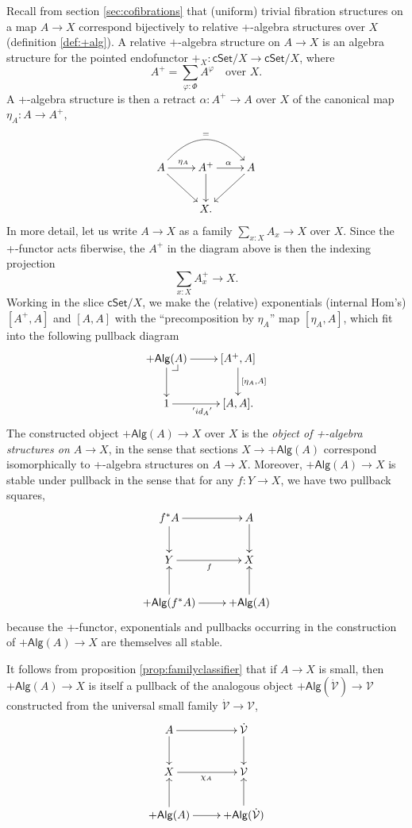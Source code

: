 \documentclass[12pt]{article}
\makeatletter
\newcommand{\cSet}{\ensuremath{\mathsf{cSet}}}
\newcommand{\pbcorner}[1][dr]{\save*!/#1-1.2pc/#1:(-1,1)@^{|-}\restore}
\newcommand{\ra}{\ensuremath{\rightarrow}}
\newcommand{\V}{\ensuremath{\mathcal{V}}}
\newcommand{\VV}{\ensuremath{\dot{\mathcal{V}}}}
\theoremstyle{remark}
\theoremstyle{definition}
\makeatother
\begin{document}
Recall from section \ref{sec:cofibrations} that (uniform) trivial fibration structures on a map $A\ra X$ correspond bijectively to relative +-algebra structures over $X$ (definition \ref{def:+alg}).  A relative $+$-algebra structure on $A \ra X$ is an algebra structure for the pointed endofunctor $+_X : \cSet/X \ra \cSet/X$, where
\[
A^+ = \sum_{\varphi:\Phi}A^{\varphi}\quad\text{over $X$}.
\]
A +-algebra structure is then a retract $\alpha : A^+\ra A$ over $X$ of the canonical map $\eta_A : A\ra A^+$,
\[
\xymatrix{
A\ar[rd] \ar[r]^{\eta_A} \ar@/^6ex/ [rr]^= & A^+ \ar[r]^{\alpha} \ar[d]& \ar[ld]A \\
& X. &
}
\]
In more detail, let us write $A\ra X$ as a family $\sum_{x:X}A_x \ra X$ over $X$. Since the +-functor acts fiberwise, the $A^+$ in the diagram above is then the indexing projection
\[
\sum_{x:X}A^+_x \ra X.
\]
Working in the slice  $\cSet/X$, we make the (relative) exponentials (internal Hom's) $[A^+, A]$ and $[A, A]$ with the ``precomposition by $\eta_A$'' map $[\eta_A, A]$, which fit into the following pullback diagram 
\[
\xymatrix{
+\mathsf{Alg}(A)\ar[d] \ar[r] \pbcorner & [A^+, A] \ar[d]^{[\eta_A, A]}\\
1 \ar[r]_{'{id_A}'} & [A, A].
}
\]
The constructed object $+\mathsf{Alg}(A) \ra X$ over $X$ is the \emph{object of +-algebra structures on $A\ra X$}, in the sense that sections $X \ra +\mathsf{Alg}(A)$ correspond isomorphically to +-algebra structures on $A\ra X$. Moreover, $+\mathsf{Alg}(A) \ra X$ is stable under pullback in the sense that for any $f:Y\ra X$, we have two pullback squares,
\begin{equation}\label{diagram:pbplus}
\xymatrix{
f^*A \ar[d] \ar[r]  & A \ar[d]\\
Y \ar[r]_{f} &X\\
+\mathsf{Alg}(f^*A)\ar[u] \ar[r] & +\mathsf{Alg}(A)\ar[u].
}
\end{equation}
because the +-functor, exponentials and pullbacks occurring in the construction of $+\mathsf{Alg}(A) \ra X$ are themselves all stable.  

It follows from proposition \ref{prop:familyclassifier} that if $A\ra X$ is small, then $+\mathsf{Alg}(A) \ra X$ is itself a pullback of the analogous object $+\mathsf{Alg}(\VV) \ra \V$ constructed from the universal small family $\VV\ra\V$,
\begin{equation}\label{diagram:tfib1}
\xymatrix{
A \ar[d] \ar[r]  & \VV \ar[d]\\
X \ar[r]_{\chi_A} & \V\\
+\mathsf{Alg}(A)\ar[u] \ar[r] & +\mathsf{Alg}(\VV)\ar[u].
}
\end{equation}
\end{document}
